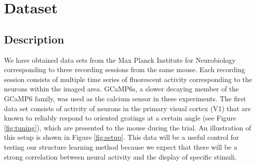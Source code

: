 \documentclass{article}
\begin{document}
\section{Dataset}

\subsection{Description}

We have obtained data sets from the Max Planck Institute for Neurobiology 
corresponding to three recording sessions from the same mouse. Each recording 
session consists of multiple time series of fluorescent activity corresponding 
to the neurons within the imaged area. GCaMP6s, a slower decaying member of 
the GCaMP6 family, was used as the calcium sensor in these experiments. The 
first data set consists of activity of neurons in the primary visual cortex 
(V1) that are known to reliably respond to oriented gratings at a certain 
angle (see Figure \ref{fig:tuning}), which are presented to the mouse during 
the trial. An illustration of this setup is shown in Figure \ref{fig:setup}. 
This data will be a useful control for testing our structure learning method 
because we expect that there will be a strong correlation between neural 
activity and the display of specific stimuli. \par
\end{document}
